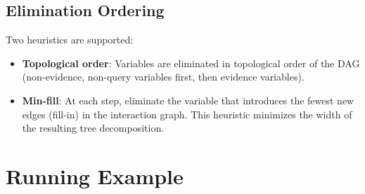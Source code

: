 \documentclass[11pt]{article}
\begin{document}
\subsection{Elimination Ordering}

Two heuristics are supported:

\begin{itemize}
  \item \textbf{Topological order}: Variables are eliminated in topological order of the
        DAG (non-evidence, non-query variables first, then evidence variables).
  \item \textbf{Min-fill}: At each step, eliminate the variable that introduces the
        fewest new edges (fill-in) in the interaction graph. This heuristic minimizes
        the width of the resulting tree decomposition.
\end{itemize}

\section{Running Example}
\end{document}
